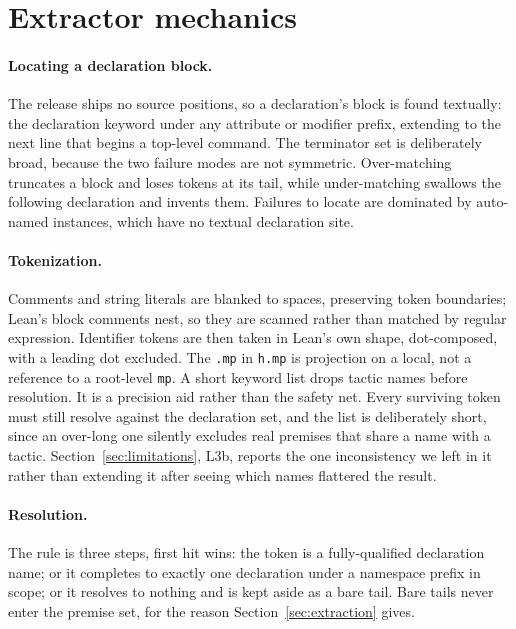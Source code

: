
\appendix

\section{Extractor mechanics}
\label{app:extractor}

\paragraph{Locating a declaration block.} The release ships no source
positions, so a declaration's block is found textually: the declaration
keyword under any attribute or modifier prefix, extending to the next line that
begins a top-level command. The terminator set is deliberately broad, because
the two failure modes are not symmetric. Over-matching truncates a block and
loses tokens at its tail, while under-matching swallows the following
declaration and invents them. Failures to locate are dominated by auto-named
instances, which have no textual declaration site.

\paragraph{Tokenization.} Comments and string literals are blanked to spaces,
preserving token boundaries; Lean's block comments nest, so they are scanned
rather than matched by regular expression. Identifier tokens are then taken in
Lean's own shape, dot-composed, with a leading dot excluded. The \texttt{.mp}
in \texttt{h.mp} is projection on a local, not a reference to a root-level
\texttt{mp}. A short keyword list drops tactic names before
resolution. It is a precision aid rather than the safety net. Every surviving
token must still resolve against the declaration set, and the list is
deliberately short, since an over-long one silently excludes real premises that share a name
with a tactic. Section~\ref{sec:limitations}, L3b, reports the one inconsistency
we left in it rather than extending it after seeing which names flattered the
result.

\paragraph{Resolution.} The rule is three steps, first hit wins: the token is a
fully-qualified declaration name; or it completes to exactly one declaration
under a namespace prefix in scope; or it resolves to nothing and is kept aside
as a bare tail. Bare tails never enter the premise set, for the reason
Section~\ref{sec:extraction} gives.

